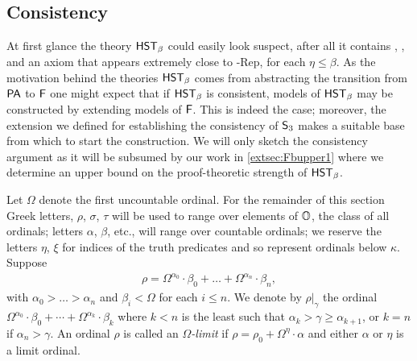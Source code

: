 \documentclass[UKenglish,cleveref,DIV=12]{scrartcl}
\theoremstyle{definition}
\theoremstyle{definition}
\begin{document}
\subsection{Consistency}\label{extsec:Fbconsis}
At first glance the theory $\mathsf{HST}_\beta$ could easily look suspect, after all it
contains \Del\eta, \Conec\eta, \Nec\eta and an axiom that appears
extremely close to \textT\eta-Rep, for each $\eta\le\beta$.
As the motivation behind the
theories $\mathsf{HST}_\beta$ comes from abstracting the transition from $\mathsf{PA}$ to
$\mathsf{F}$ one might expect that if $\mathsf{HST}_\beta$ is consistent, models of $\mathsf{HST}_\beta$
may be constructed by extending models
of $\mathsf{F}$. This is indeed the case; moreover, the extension we defined for
establishing the consistency of $\mathsf{S}_3$ makes a suitable base from which to start the construction. We will only sketch the consistency argument as it will be subsumed
by our work in \cref{extsec:Fbupper1} where we determine an upper bound on the
proof-theoretic strength of $\mathsf{HST}_\beta$.

Let $\Omega$ denote the first uncountable ordinal. For the remainder of this
section Greek letters, $\rho$, $\sigma$, $\tau$ will be used to range over
elements of $\mathbb{O}$, the class of all ordinals; letters $\alpha$, $\beta$, etc., will
range over countable ordinals; we reserve the letters $\eta$, $\xi$ for
indices of the truth predicates and so represent ordinals below $\kappa$.
Suppose
\begin{align*}
  \rho=\Omega^{\alpha_0}\cdot\beta_0+\dots+\Omega^{\alpha_n}\cdot\beta_n,
\end{align*}
 with $\alpha_0>\dots>\alpha_n$ and $\beta_i<\Omega$ for each $i\le n$. We denote by $\rho|_\gamma$ the ordinal
$\Omega^{\alpha_0}\cdot\beta_0+\cdots+\Omega^{\alpha_k}\cdot\beta_k$ where $k<n$
is the least such that $\alpha_k>\gamma\ge\alpha_{k+1}$, or $k=n$ if
$\alpha_n>\gamma$. An ordinal $\rho$ is called an {\em $\Omega$-limit} if $\rho=\rho_0+\Omega^\eta\cdot\alpha$ and either $\alpha$ or $\eta$ is a
limit ordinal.
\end{document}
